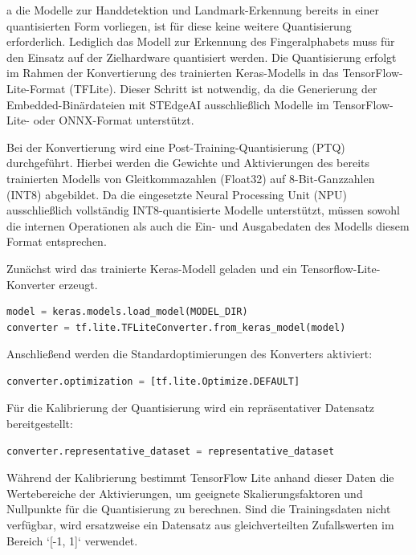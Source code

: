 a die Modelle zur Handdetektion und Landmark-Erkennung bereits in einer quantisierten Form vorliegen, ist für diese keine weitere Quantisierung erforderlich. Lediglich das Modell zur Erkennung des Fingeralphabets muss für den Einsatz auf der Zielhardware quantisiert werden. Die Quantisierung erfolgt im Rahmen der Konvertierung des trainierten Keras-Modells in das TensorFlow-Lite-Format (TFLite). Dieser Schritt ist notwendig, da die Generierung der Embedded-Binärdateien mit STEdgeAI ausschließlich Modelle im TensorFlow-Lite- oder ONNX-Format unterstützt.

Bei der Konvertierung wird eine Post-Training-Quantisierung (PTQ) durchgeführt. Hierbei werden die Gewichte und Aktivierungen des bereits trainierten Modells von Gleitkommazahlen (Float32) auf 8-Bit-Ganzzahlen (INT8) abgebildet. Da die eingesetzte Neural Processing Unit (NPU) ausschließlich vollständig INT8-quantisierte Modelle unterstützt, müssen sowohl die internen Operationen als auch die Ein- und Ausgabedaten des Modells diesem Format entsprechen.

Zunächst wird das trainierte Keras-Modell geladen und ein Tensorflow-Lite-Konverter erzeugt.

\begin{lstlisting}[language=python, caption={TensorFlow-Lite Konverter erzeugen}, label={lst:tflite-converter}]
model = keras.models.load_model(MODEL_DIR)
converter = tf.lite.TFLiteConverter.from_keras_model(model)
\end{lstlisting}

Anschließend werden die Standardoptimierungen des Konverters aktiviert:

\begin{lstlisting}[language=python, caption={Optimierung aktivieren}, label={lst:tflite-optimization}]
converter.optimization = [tf.lite.Optimize.DEFAULT]
\end{lstlisting}

Für die Kalibrierung der Quantisierung wird ein repräsentativer Datensatz bereitgestellt:

\begin{lstlisting}[language=python, caption={Repräsentativer Datensatz}, label={lst:tflite-representative}]
converter.representative_dataset = representative_dataset
\end{lstlisting}

Während der Kalibrierung bestimmt TensorFlow Lite anhand dieser Daten die Wertebereiche der Aktivierungen, um geeignete Skalierungsfaktoren und Nullpunkte für die Quantisierung zu berechnen. Sind die Trainingsdaten nicht verfügbar, wird ersatzweise ein Datensatz aus gleichverteilten Zufallswerten im Bereich `[-1, 1]` verwendet.

